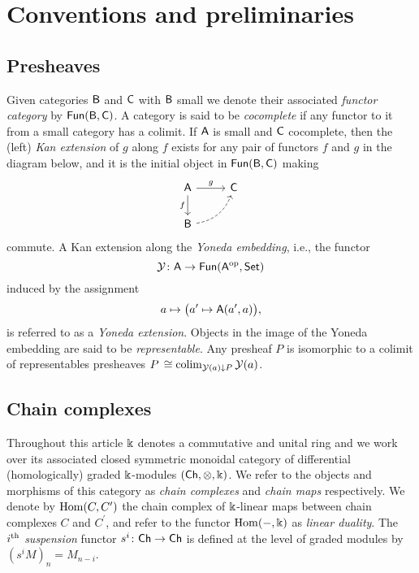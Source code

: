 
\section{Conventions and preliminaries}\label{s:preliminaries}

\subsection{Presheaves}

Given categories $\mathsf{B}$ and $\mathsf{C}$ with $\mathsf{B}$ small we denote their associated \textit{functor category} by $\mathsf{Fun}(\mathsf{B}, \mathsf{C})$.
A category is said to be \textit{cocomplete} if any functor to it from a small category has a colimit.
If $\mathsf{A}$ is small and $\mathsf{C}$ cocomplete, then the (left) \textit{Kan extension} of $g$ along $f$ exists for any pair of functors $f$ and $g$ in the diagram below, and it is the initial object in $\mathsf{Fun}(\mathsf{B}, \mathsf{C})$ making
\begin{equation*}
	\begin{tikzcd}[column sep=normal, row sep=normal]
		\sA \arrow[d, "f"'] \arrow[r, "g"] & \sC \\
		\sB \arrow[dashed, ur, bend right] & \quad
	\end{tikzcd}
\end{equation*}
commute.
A Kan extension along the \textit{Yoneda embedding}, i.e., the functor
\[
\operatorname{\mathcal{Y}} \colon \mathsf{A} \to \mathsf{Fun}(\mathsf{A}^{\mathrm{op}}, \mathsf{Set})
\]
induced by the assignment
\[
a \mapsto \big( a^\prime \mapsto \mathsf{A}(a^\prime, a) \big),
\]
is referred to as a \textit{Yoneda extension}.
Objects in the image of the Yoneda embedding are said to be \textit{representable}.
Any presheaf $P$ is isomorphic to a colimit of representables presheaves $P \, \cong \operatorname*{colim}_{\operatorname{\mathcal{Y}}(a) \downarrow P} \operatorname{\mathcal{Y}}(a)$.

\subsection{Chain complexes}

Throughout this article $\Bbbk$ denotes a commutative and unital ring and we work over its associated closed symmetric monoidal category of differential (homologically) graded $\Bbbk$-modules $(\mathsf{Ch}, \otimes, \Bbbk)$.
We refer to the objects and morphisms of this category as \textit{chain complexes} and \textit{chain maps} respectively.
We denote by $\mathrm{Hom}(C, C^\prime)$ the chain complex of $\Bbbk$-linear maps between chain complexes $C$ and $C^\prime$, and refer to the functor $\mathrm{Hom}(-, \Bbbk)$ as \textit{linear duality}.
The $i^{\mathrm{th}}$ \textit{suspension} functor $s^i \colon \mathsf{Ch} \to \mathsf{Ch}$ is defined at the level of graded modules by $(s^{i}M)_n = M_{n-i}$.


